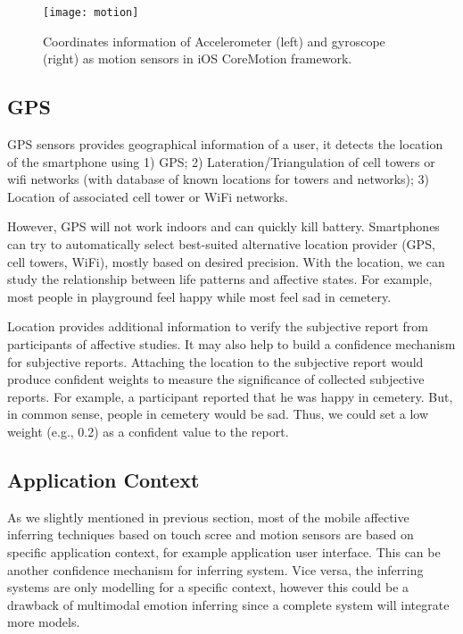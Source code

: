 \begin{figure}
    \centering
    \texttt{[image: motion]}
    \caption{Coordinates information of Accelerometer (left) and gyroscope (right) as motion sensors in iOS CoreMotion framework.}
    \label{fig:motion}
\end{figure}

\subsection{GPS}\label{subsec:gps}

GPS sensors provides geographical information of a user, it detects the location of the smartphone using 1) GPS; 2) Lateration/Triangulation of cell towers or wifi networks (with database of known locations for towers and networks); 3) Location of associated cell tower or WiFi networks.

However, GPS will not work indoors and can quickly kill battery. Smartphones can try to automatically select best-suited alternative location provider (GPS, cell towers, WiFi), mostly based on desired precision. With the location, we can study the relationship between life patterns and affective states. For example, most people in playground feel happy while most feel sad in cemetery.

Location provides additional information to verify the subjective report from participants of affective studies. It may also help to build a confidence mechanism \cite{tan2013connectivity} for subjective reports. Attaching the location to the subjective report would produce confident weights to measure the significance of collected subjective reports. For example, a participant reported that he was happy in cemetery. But, in common sense, people in cemetery would be sad. Thus, we could set a low weight (e.g., 0.2) as a confident value to the report.

\subsection{Application Context}\label{subsec:ui}

As we slightly mentioned in previous section, most of the mobile affective inferring techniques based on touch scree and motion sensors\cite{Gao2012, Shah2015, Mottelson2016, bhattacharya2017predictive} are based on specific application context, for example application user interface. This can be another confidence mechanism for inferring system. Vice versa, the inferring systems are only modelling for a specific context, however this could be a drawback of multimodal emotion inferring since a complete system will integrate more models.
